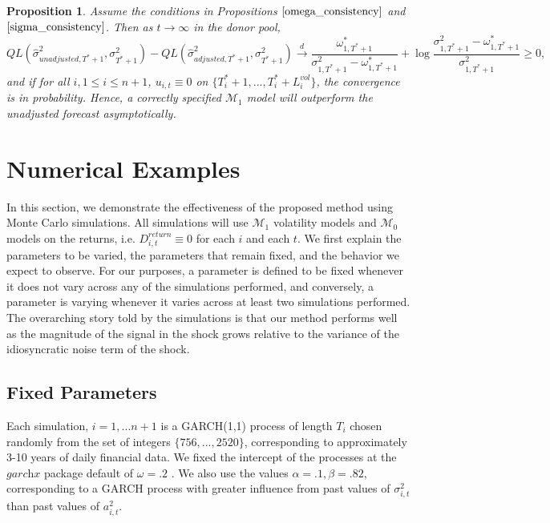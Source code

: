 \documentclass{uiucthesis2021}
\def\mc#1{\mathcal{#1}} %
\def\mc#1{\mathcal{#1}}
\newtheorem{prop}{Proposition}
\theoremstyle{definition}
\begin{document}
\begin{prop}\label{asymptotic_consistency}
Assume the conditions in Propositions $\ref{omega_consistency}$ and $\ref{sigma_consistency}$.  Then as $t\rightarrow \infty$ in the donor pool,
$$QL(\hat\sigma_{unadjusted,T^{*}+1}^{2},\sigma^{2}_{T^{*}+1})-QL(\hat\sigma^{2}_{adjusted,T^{*}+1},\sigma^{2}_{T^{*}+1}) \overset{d}{\longrightarrow} \frac{\omega_{1,T^{*}+1}^{*}}{\sigma^{2}_{1,T^{*}+1}-\omega_{1,T^{*}+1}^{*}} + \log{\frac{\sigma_{1,T^{*}+1}^{2}-\omega_{1,T^{*}+1}^{*}}{\sigma_{1,T^{*}+1}^{2}} } \geq 0,$$ and if for all $i, 1 \leq i \leq n+ 1$, $u_{i,t} \equiv 0$ on $\{T^{*}_{i}+1,... ,T^{*}_{i}+L_{i}^{vol}\}$, the convergence is in probability.  Hence, a correctly specified $\mc{M}_1$ model will outperform the unadjusted forecast asymptotically.
\end{prop}

\section{Numerical Examples}

In this section, we demonstrate the effectiveness of the proposed method using Monte Carlo simulations.  All simulations will use $\mc{M}_1$ volatility models and $\mc{M}_0$ models on the returns, i.e. $  D^{return}_{i,t} \equiv 0$ for each $i$ and each $t$.  We first explain the parameters to be varied, the parameters that remain fixed, and the behavior we expect to observe.  For our purposes, a parameter is defined to be fixed whenever it does not vary across any of the simulations performed, and conversely, a parameter is varying whenever it varies across at least two simulations performed. The overarching story told by the simulations is that our method performs well as the magnitude of the signal in the shock grows relative to the variance of the idiosyncratic noise term of the shock. 

  \subsection{Fixed Parameters}
Each simulation, $i=1,...n+1$ is a GARCH(1,1) process of length $T_{i}$ chosen randomly from the set of integers $\{756,...,2520\}$, corresponding to approximately 3-10 years of daily financial data.  We fixed the intercept of the processes at the $\textit{garchx}$ package default of $\omega = .2$ \parencite[][]{RePEc:pra:mprapa:100301}.  We also use the values $\alpha=.1, \beta = .82$, corresponding to a GARCH process with greater influence from past values of $\sigma^{2}_{i,t}$ than past values of $a^{2}_{i,t}$.
\end{document}
